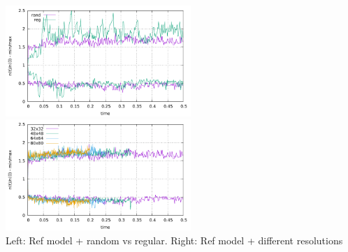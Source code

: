\begin{center}
\includegraphics[width=7cm]{python_codes/fieldstone_30/results_streamline/markercount_reg}
\includegraphics[width=7cm]{python_codes/fieldstone_30/results_streamline/markercount_res}\\
{\captionfont Left: Ref model + random vs regular. Right: Ref model + different resolutions}
\end{center}








